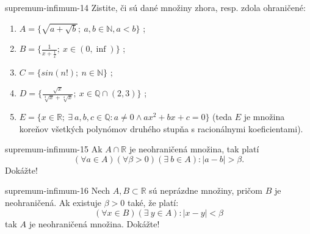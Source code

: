 \begin{defproblem}{supremum-infimum-14}
Zistite, či sú dané množiny zhora, resp. zdola ohraničené:
\begin{enumerate}
  \item $A = \{ \sqrt{a + \sqrt{b}} ; \: a, b \in \mathbb{N}, a < b \}$ ;
  \item $B = \{ \frac{1}{x + \frac{1}{x}} ; \: x \in (0, \inf) \}$ ;
  \item $C = \{ sin(n!) ; \: n \in \mathbb{N} \}$ ;
  \item $D = \{ \frac{\sqrt{x}}{\sqrt[3]{x} + \sqrt[4]{x}}; \:
              x \in \mathbb{Q} \cap (2, 3) \}$ ;
  \item $E = \{ x \in \mathbb{R}; \: \exists \: a, b, c \in \mathbb{Q}:
                a \neq 0 \land ax^2 + bx +c = 0 \}$
        (teda $E$ je množina koreňov všetkých polynómov druhého stupňa s
        racionálnymi koeficientami).
\end{enumerate}
\end{defproblem}

\begin{defproblem}{supremum-infimum-15}
Ak $A \cap \mathbb{R}$ je neohraničená množina, tak platí
$$
(\forall a \in A) (\forall \beta > 0) (\exists \: b \in A): |a - b| > \beta .
$$
Dokážte!
\end{defproblem}

\begin{defproblem}{supremum-infimum-16}
Nech $A, B \subset \mathbb{R}$ sú neprázdne množiny, pričom $B$ je
neohraničená. Ak existuje $\beta > 0$ také, že platí:
$$
(\forall x \in B) (\exists \: y \in A): |x - y| < \beta
$$
tak $A$ je neohraničená množina. Dokážte!
\end{defproblem}

